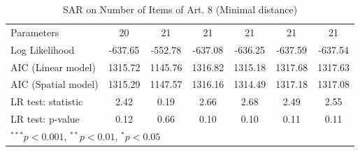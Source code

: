 \begin{table}[!h]
\begin{center}
\begin{tabular}{l c c c c c c }
Parameters              & 20           & 21           & 21           & 21           & 21           & 21           \\
Log Likelihood          & -637.65      & -552.78      & -637.08      & -636.25      & -637.59      & -637.54      \\
AIC (Linear model)      & 1315.72      & 1145.76      & 1316.82      & 1315.18      & 1317.68      & 1317.63      \\
AIC (Spatial model)     & 1315.29      & 1147.57      & 1316.16      & 1314.49      & 1317.18      & 1317.08      \\
LR test: statistic      & 2.42         & 0.19         & 2.66         & 2.68         & 2.49         & 2.55         \\
LR test: p-value        & 0.12         & 0.66         & 0.10         & 0.10         & 0.11         & 0.11         \\
\bottomrule
\multicolumn{7}{l}{\scriptsize{$^{***}p<0.001$, $^{**}p<0.01$, $^*p<0.05$}}
\end{tabular}
\caption{SAR on Number of Items of Art. 8 (Minimal distance)}
\label{table:coefficients}
\end{center}
\end{table}

